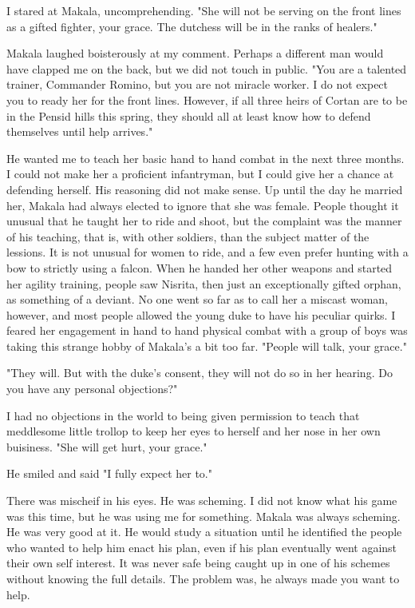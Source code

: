 \documentclass{article}
\begin{document}
I stared at Makala, uncomprehending. "She will not be serving on the front lines as a gifted fighter, your grace. The dutchess will be in the ranks of healers."

Makala laughed boisterously at my comment. Perhaps a different man would have clapped me on the back, but we did not touch in public. "You are a talented trainer, Commander Romino, but you are not miracle worker. I do not expect you to ready her for the front lines. However, if all three heirs of Cortan are to be in the Pensid hills this spring, they should all at least know how to defend themselves until help arrives." 

He wanted me to teach her basic hand to hand combat in the next three months. I could not make her a proficient infantryman, but I could give her a chance at defending herself. His reasoning did not make sense. Up until the day he married her, Makala had always elected to ignore that she was female. People thought it unusual that he taught her to ride and shoot, but the complaint was the manner of his teaching, that is, with other soldiers, than the subject matter of the lessions. It is not unusual for women to ride, and a few even prefer hunting with a bow to strictly using a falcon. When he handed her other weapons and started her agility training, people saw Nisrita, then just an exceptionally gifted orphan, as something of a deviant. No one went so far as to call her a miscast woman, however, and most people allowed the young duke to have his peculiar quirks. I feared her engagement in hand to hand physical combat with a group of boys was taking this strange hobby of Makala's a bit too far. "People will talk, your grace."

"They will. But with the duke's consent, they will not do so in her hearing. Do you have any personal objections?"

I had no objections in the world to being given permission to teach that meddlesome little trollop to keep her eyes to herself and her nose in her own buisiness. "She will get hurt, your grace."

He smiled and said "I fully expect her to." 

There was mischeif in his eyes. He was scheming. I did not know what his game was this time, but he was using me for something. Makala was always scheming. He was very good at it. He would study a situation until he identified the people who wanted to help him enact his plan, even if his plan eventually went against their own self interest. It was never safe being caught up in one of his schemes without knowing the full details. The problem was, he always made you want to help.
\end{document}
